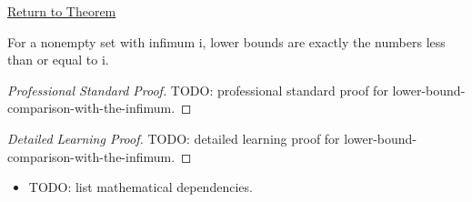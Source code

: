\newpage
{}
\label{prf:lower-bound-comparison-with-the-infimum}

\begin{remark*}[Return]
\hyperref[prop:lower-bound-comparison-with-the-infimum]{Return to Theorem}
\end{remark*}

\begin{proposition*}
For a nonempty set with infimum i, lower bounds are exactly the numbers less than or equal to i.
\end{proposition*}

\begin{proof}[Professional Standard Proof]
\LRAProofBodyStart
TODO: professional standard proof for lower-bound-comparison-with-the-infimum.
\end{proof}

\begin{proof}[Detailed Learning Proof]
\LRAProofBodyStart
TODO: detailed learning proof for lower-bound-comparison-with-the-infimum.
\end{proof}

\begin{remark*}
\end{remark*}

\begin{dependencies}
\begin{itemize}
  \item TODO: list mathematical dependencies.
\end{itemize}
\end{dependencies}

\clearpage
